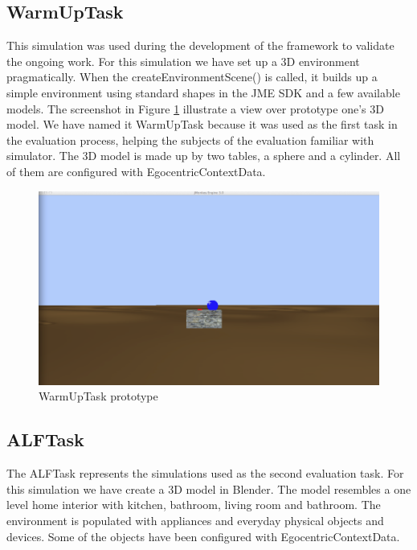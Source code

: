 \subsection{WarmUpTask} %
\label{subsec:impl_warmup_task}
This simulation was used during the development of the framework to validate the ongoing work. For this simulation we have set up a 3D environment pragmatically. When the createEnvironmentScene() is called, it builds up a simple environment using standard shapes in the JME SDK and a few available models. The screenshot in Figure \ref{fig:impl_prototype1} illustrate a view over prototype one's 3D model. We have named it WarmUpTask because it was used as the first task in the evaluation process, helping the subjects of the evaluation familiar with simulator. The 3D model is made up by two tables, a sphere and a cylinder. All of them are configured with EgocentricContextData.
\begin{figure}[H]
	\centering
	\includegraphics[width=0.8\linewidth]{gfx/Chapter4/prototype1}
	\caption{WarmUpTask prototype}
	\label{fig:impl_prototype1}
\end{figure}

\subsection{ALFTask} %
\label{subsec:impl_alf_task}
The ALFTask represents the simulations used as the second evaluation task. For this simulation we have create a 3D model in Blender. The model resembles a one level home interior with kitchen, bathroom, living room and bathroom. The environment is populated with appliances and everyday physical objects and devices. Some of the objects have been configured with EgocentricContextData.\\

